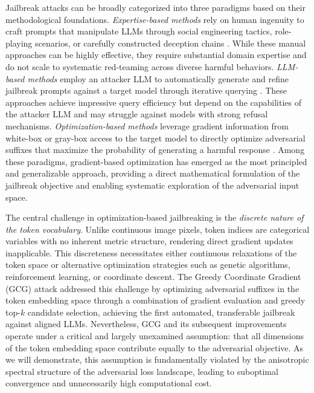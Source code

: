 \documentclass[preprint,12pt]{elsarticle}
\begin{document}
Jailbreak attacks can be broadly categorized into three paradigms based on their methodological foundations. \textit{Expertise-based methods} rely on human ingenuity to craft prompts that manipulate LLMs through social engineering tactics, role-playing scenarios, or carefully constructed deception chains \cite{zeng2024persuasion}. While these manual approaches can be highly effective, they require substantial domain expertise and do not scale to systematic red-teaming across diverse harmful behaviors. \textit{LLM-based methods} employ an attacker LLM to automatically generate and refine jailbreak prompts against a target model through iterative querying \cite{chao2023jailbreaking, mehrotra2023tree}. These approaches achieve impressive query efficiency but depend on the capabilities of the attacker LLM and may struggle against models with strong refusal mechanisms. \textit{Optimization-based methods} leverage gradient information from white-box or gray-box access to the target model to directly optimize adversarial suffixes that maximize the probability of generating a harmful response \cite{zou2023universal, jia2024improved, zhu2023autodan}. Among these paradigms, gradient-based optimization has emerged as the most principled and generalizable approach, providing a direct mathematical formulation of the jailbreak objective and enabling systematic exploration of the adversarial input space.

The central challenge in optimization-based jailbreaking is the \textit{discrete nature of the token vocabulary}. Unlike continuous image pixels, token indices are categorical variables with no inherent metric structure, rendering direct gradient updates inapplicable. This discreteness necessitates either continuous relaxations of the token space or alternative optimization strategies such as genetic algorithms, reinforcement learning, or coordinate descent. The Greedy Coordinate Gradient (GCG) attack \cite{zou2023universal} addressed this challenge by optimizing adversarial suffixes in the token embedding space through a combination of gradient evaluation and greedy top-$k$ candidate selection, achieving the first automated, transferable jailbreak against aligned LLMs. Nevertheless, GCG and its subsequent improvements operate under a critical and largely unexamined assumption: that all dimensions of the token embedding space contribute equally to the adversarial objective. As we will demonstrate, this assumption is fundamentally violated by the anisotropic spectral structure of the adversarial loss landscape, leading to suboptimal convergence and unnecessarily high computational cost.
\end{document}
